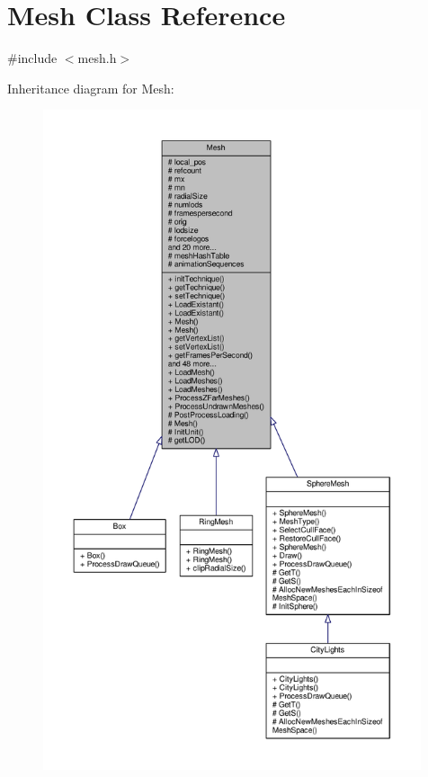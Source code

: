 \hypertarget{classMesh}{}\section{Mesh Class Reference}
\label{classMesh}


{\ttfamily \#include $<$mesh.\+h$>$}



Inheritance diagram for Mesh\+:
\nopagebreak
\begin{figure}[H]
\begin{center}
\leavevmode
\includegraphics[height=550pt]{d5/d64/classMesh__inherit__graph}
\end{center}
\end{figure}


